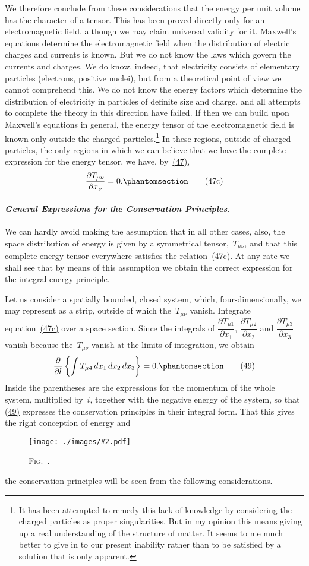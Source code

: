 \documentclass[12pt]{book}[2005/09/16]
\newcommand{\Paragraph}[1]{\paragraph*{\indent\normalfont\itshape#1}}
\newcounter{figno}
\newcommand{\Figure}[2][0.75\textwidth]{%
\begin{figure}[hbt!]
  \refstepcounter{figno}
  \centering
  \texttt{[image: ./images/\#2.pdf]}
  \caption{\textsc{Fig}.~\thefigno.}
  \label{fig:\thefigno}
\end{figure}
}
\newcommand{\Change}[2]{#2}
\newcommand{\Add}[1]{\Change{}{#1}}
\newcommand{\PageSep}[1]{\ignorespaces}
\newcommand{\Tag}[1]{%
  \phantomsection
  \label{eqn:#1}
  \tag*{#1}
}
\newcommand{\Eqref}[1]{\hyperref[eqn:#1]{#1}}
\newcommand{\dd}{\partial}
\begin{document}
We therefore conclude from these considerations that
the energy per unit volume has the character of a tensor.
This has been proved directly only for an electromagnetic
field, although we may claim universal validity for it.
Maxwell's equations determine the electromagnetic field
when the distribution of electric charges and currents is
known. But we do not know the laws which govern
the currents and charges. We do know, indeed, that
electricity consists of elementary particles (electrons,
positive nuclei), but from a theoretical point of view we
cannot comprehend this. We do not know the energy
factors which determine the distribution of electricity in
particles of definite size and charge, and all attempts to
complete the theory in this direction have failed. If then
we can build upon Maxwell's equations in general, the
\PageSep{55}
energy tensor of the electromagnetic field is known only
outside the charged particles.\footnote
  {It has been attempted to remedy this lack of knowledge by considering
  the charged particles as proper singularities. But in my opinion this means
  giving up a real understanding of the structure of matter. It seems to me
  much better to give in to our present inability rather than to be satisfied
  by a solution that is only apparent.}
In these regions, outside
of charged particles, the only regions in which we can
believe that we have the complete expression for the
energy tensor, we have, by~\Eqref{(47)},
\[
\frac{\dd T_{\mu\nu}}{\dd x_{\nu}} = 0\Add{.}
\Tag{(47c)}
\]

\Paragraph{General Expressions for the Conservation Principles.} We
%
%
can hardly avoid making the assumption that in all other
cases, also, the space distribution of energy is given by a
symmetrical tensor,~$T_{\mu\Change{}{\nu}}$, and that this complete energy
tensor everywhere satisfies the relation~\Eqref{(47c)}. At any
rate we shall see that by means of this assumption we
obtain the correct expression for the integral energy
principle.

Let us consider a spatially bounded, closed system,
which, four-dimensionally, we may represent as a strip,
outside of which the~$T_{\mu\nu}$ vanish. Integrate equation~\Eqref{(47c)}
over a space section. Since the integrals of
$\dfrac{\dd T_{\mu1}}{\dd x_{1}}$, $\dfrac{\dd T_{\mu2}}{\dd x_{2}}$ and $\dfrac{\dd T_{\mu3}}{\dd x_{3}}$ vanish because the~$T_{\mu\nu}$ vanish at the
limits of integration, we obtain
\[
\frac{\dd}{\dd l}\left\{\int T_{\mu4}\, dx_{1}\, dx_{2}\, dx_{3} \right\}
  = 0\Add{.}
\Tag{(49)}
\]
Inside the parentheses are the expressions for the
\PageSep{56}
momentum of the whole system, multiplied by~$i$, together
with the negative energy of the system, so that \Eqref{(49)}
expresses the conservation principles in their integral
form. That this gives the right conception of energy and
\Figure{056}
the conservation principles will be seen from the following
considerations.
\end{document}
